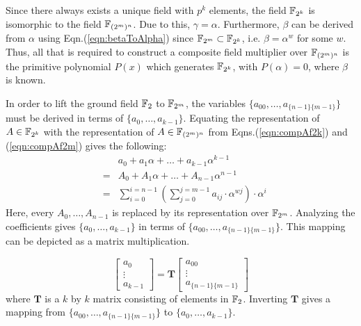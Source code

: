 Since there always exists a unique field with $p^k$ elements, the field ${\mathbb{F}}_{2^k}$ is isomorphic to 
the field ${\mathbb{F}}_{(2^m)^n}$. Due to this, $\gamma = \alpha$. Furthermore, $\beta$ can be derived 
from $\alpha$ using Eqn.(\ref{eqn:betaToAlpha}) since ${\mathbb{F}}_{2^m} \subset {\mathbb{F}}_{2^k}$, i.e. 
$\beta=\alpha^w$ for some $w$. Thus, all
that is required to construct a composite field multiplier over ${\mathbb{F}}_{(2^m)^n}$ is 
the primitive polynomial $P(x)$ which generates ${\mathbb{F}}_{2^k}$, with $P(\alpha)=0$, 
where $\beta$ is known.

In order to lift the ground field ${\mathbb{F}}_2$ to ${\mathbb{F}}_{2^m}$, the variables $\{a_{00},\dots,a_{\{n-1\}\{m-1\}}\}$
must be derived in terms of $\{a_0,\dots,a_{k-1}\}$. Equating the representation of $A\in{\mathbb{F}}_{2^k}$
with the representation of $A\in{\mathbb{F}}_{(2^m)^n}$ from Eqns.(\ref{eqn:compAf2k}) and (\ref{eqn:compAf2m}) 
gives the following:
\begin{eqnarray}
& &a_0+a_1\alpha+\dots+a_{k-1}\alpha^{k-1} \nonumber \\
&=&A_0+A_1\alpha+\dots+A_{n-1}\alpha^{n-1} \nonumber \\
&=&\sum_{i=0}^{i=n-1}(\sum_{j=0}^{j=m-1}a_{ij} \cdot \alpha^{wj}) \cdot \alpha^i
\end{eqnarray}
%
Here, every $A_0,\dots,A_{n-1}$ is replaced by its representation over ${\mathbb{F}}_{2^m}$. Analyzing
the coefficients
gives $\{a_0,\dots,a_{k-1}\}$ in terms of $\{a_{00},\dots,a_{\{n-1\}\{m-1\}}\}$. This mapping can be
depicted as a matrix multiplication.

\begin{equation}
\begin{bmatrix} a_0\\ \vdots \\ a_{k-1}\end{bmatrix}
=\mathbf{T}
\begin{bmatrix} a_{00}\\ \vdots \\ a_{\{n-1\}\{m-1\}}\end{bmatrix}
\end{equation}
where $\mathbf{T}$ is a $k$ by $k$ matrix consisting of elements in ${\mathbb{F}}_2$. Inverting 
$\mathbf{T}$ gives a mapping from $\{a_{00},\dots,a_{\{n-1\}\{m-1\}}\}$ to $\{a_0,\dots,a_{k-1}\}$.


